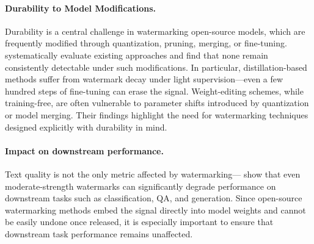 \paragraph{Durability to Model Modifications.}
Durability is a central challenge in watermarking open-source models, which are frequently modified through quantization, pruning, merging, or fine-tuning. \citet{gloaguen2025towards} systematically evaluate existing approaches and find that none remain consistently detectable under such modifications.  In particular, distillation-based methods suffer from watermark decay under light supervision—even a few hundred steps of fine-tuning can erase the signal. Weight-editing schemes, while training-free, are often vulnerable to parameter shifts introduced by quantization or model merging. Their findings highlight the need for watermarking techniques designed explicitly with durability in mind.

\paragraph{Impact on downstream performance.}
Text quality is not the only metric affected by watermarking—\citet{ajith-etal-2024-downstream} show that even moderate-strength watermarks can significantly degrade performance on downstream tasks such as classification, QA, and generation. Since open-source watermarking methods embed the signal directly into model weights and cannot be easily undone once released, it is especially important to ensure that downstream task performance remains unaffected.


